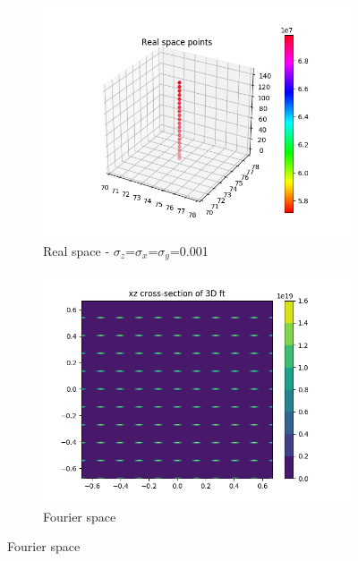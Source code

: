 \documentclass{article}
\begin{document}
\begin{figure}[h]
        \centering
        \begin{subfigure}{0.45\textwidth}
                \centering
                \includegraphics[width=\textwidth]{real_3d_lowsig.png}
                \caption{Real space - $\sigma_z$=$\sigma_x$=$\sigma_y$=0.001}\label{fig:real_3d_hex_lowsig}
        \end{subfigure}
        \begin{subfigure}{0.45\textwidth}
                \centering
                \includegraphics[width=\textwidth]{fourier_3d_hex_lowsig.png}
                \caption{Fourier space}\label{fig:fourier_3d_hex_lowsig}
        \end{subfigure}

\end{figure}
\end{document}

